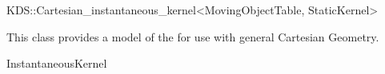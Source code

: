 

\begin{ccRefClass}{KDS::Cartesian_instantaneous_kernel<MovingObjectTable, StaticKernel>}  %


\ccDefinition
  
This class provides a model of the  for use with general Cartesian Geometry.


\ccIsModel

InstantaneousKernel

\end{ccRefClass}


